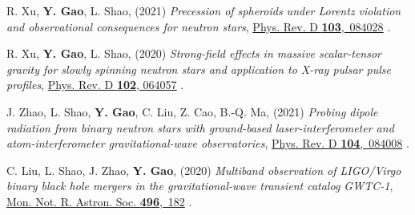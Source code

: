 \begin{etaremune}
\item 
  R. Xu, 
  {\bf Y. Gao}, 
  L. Shao, 
  (2021)
  {\it Precession of spheroids under Lorentz violation and observational consequences for neutron stars}, 
  \href{https://doi.org/10.1103/PhysRevD.103.084028}{Phys. Rev. D {\bf 103},~084028}
  .
\item 
  R. Xu, 
  {\bf Y. Gao}, 
  L. Shao, 
  (2020)
  {\it Strong-field effects in massive scalar-tensor gravity for slowly spinning neutron stars and application to X-ray pulsar pulse profiles}, 
  \href{https://doi.org/10.1103/PhysRevD.102.064057}{Phys. Rev. D {\bf 102}, 064057}
  .
\item 
  J. Zhao, 
  L. Shao, 
  {\bf Y. Gao}, 
  C. Liu, 
  Z. Cao, 
  B.-Q. Ma,
  (2021) 
  {\it Probing dipole radiation from binary neutron stars with ground-based laser-interferometer and atom-interferometer gravitational-wave observatories}, 
  \href{https://doi.org/10.1103/PhysRevD.104.084008}{Phys. Rev. D {\bf 104},~084008}
  .
\item 
  C. Liu, 
  L. Shao, 
  J. Zhao, 
  {\bf Y. Gao}, 
  (2020)
  {\it Multiband observation of LIGO/Virgo binary black hole mergers in the gravitational-wave transient catalog GWTC-1}, 
  \href{https://doi.org/10.1093/mnras/staa1512}{Mon. Not. R. Astron. Soc. {\bf 496},~182}
  .
\end{etaremune}



